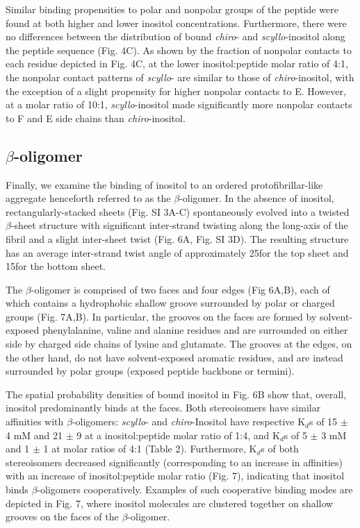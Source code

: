 Similar binding propensities to polar and nonpolar groups of the peptide were found at both higher and lower inositol concentrations. Furthermore, there were no differences between the distribution of bound \emph{chiro}- and \emph{scyllo}-inositol along the peptide sequence (Fig. 4C). As shown by the fraction of nonpolar contacts to each residue depicted in Fig. 4C, at the lower inositol:peptide molar ratio of 4:1, the nonpolar contact patterns of \emph{scyllo}- are similar to those of \emph{chiro}-inositol, with the exception of a slight propensity for higher nonpolar contacts to E. However, at a molar ratio of 10:1, \emph{scyllo}-inositol made significantly more nonpolar contacts to F and E side chains than \emph{chiro}-inositol.


\subsection{$\beta$-oligomer}

Finally, we examine the binding of inositol to an ordered protofibrillar-like aggregate henceforth referred to as the $\beta$-oligomer. In the absence of inositol, rectangularly-stacked sheets (Fig. SI 3A-C) spontaneously evolved into a twisted $\beta$-sheet structure with significant inter-strand twisting along the long-axis of the fibril and a slight inter-sheet twist (Fig. 6A, Fig. SI 3D). The resulting structure has an average inter-strand twist angle of approximately 25\mathdeg for the top sheet and 15\mathdeg for the bottom sheet. 

The $\beta$-oligomer is comprised of two faces and four edges (Fig 6A,B), each of which contains a hydrophobic shallow groove surrounded by polar or charged groups (Fig. 7A,B).  In particular, the grooves on the faces are formed by solvent-exposed phenylalanine, valine and alanine residues and are surrounded on either side by charged side chains of lysine and glutamate. The grooves at the edges, on the other hand, do not have solvent-exposed aromatic residues, and are instead surrounded by polar groups (exposed peptide backbone or termini).

The spatial probability densities of bound inositol in Fig. 6B show that, overall, inositol predominantly binds at the faces. Both stereoisomers have similar affinities with $\beta$-oligomers: \emph{scyllo}- and \emph{chiro}-Inositol have respective K$_d$s of 15 $\pm$ 4 mM and  21 $\pm$ 9 at a inositol:peptide molar ratio of 1:4, and K$_{d}$s of 5 $\pm$ 3 mM and 1 $\pm$ 1 at molar ratios of 4:1 (Table 2).   Furthermore, K$_d$s of both stereoisomers decreased significantly (corresponding to an increase in affinities) with an increase of inositol:peptide molar ratio (Fig. 7), indicating that inositol binds $\beta$-oligomers cooperatively.  Examples of such cooperative binding modes are depicted in Fig. 7, where inositol molecules are clustered together on shallow grooves on the faces of the $\beta$-oligomer.

